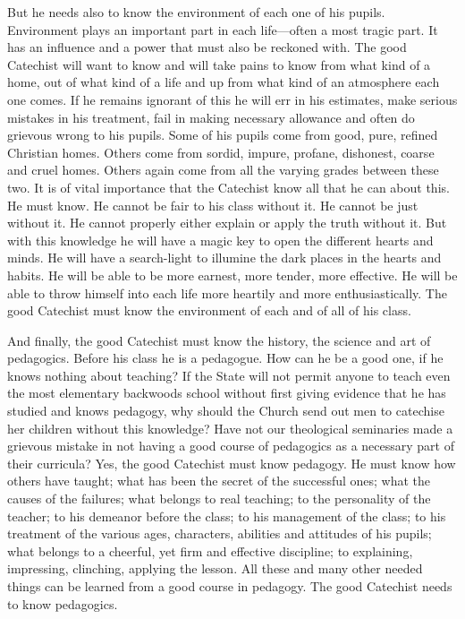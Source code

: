  But he needs also to know the environment of each one of his pupils. Environment plays an important part in each life—often a most tragic part. It has an influence and a power that must also be reckoned with. The good Catechist will want to know and will take pains to know from what kind of a home, out of what kind of a life and up from what kind of an atmosphere each one comes. If he remains ignorant of this he will err in his estimates, make serious mistakes in his treatment, fail in making necessary allowance and often do grievous wrong to his pupils. Some of his pupils come from good, pure, refined Christian homes. Others come from sordid, impure, profane, dishonest, coarse and
cruel homes. Others again come from all the varying grades between these two. It is of vital importance that the Catechist know all that he can about this. He must know. He cannot be fair to his class without it. He cannot be just without it. He cannot properly either explain or apply the truth without it. But with this knowledge he will have a magic key to open the different hearts and minds. He will have a search-light to illumine the dark places in the hearts and habits. He will be able to be more earnest, more tender, more effective. He will be able to throw himself into each life more heartily and more enthusiastically. The good Catechist must know the environment of each and of all of his class.

 And finally, the good Catechist must know the history, the science and art of pedagogics. Before his class he is a pedagogue. How can he be a good one, if he knows nothing about teaching? If the State will not permit anyone to teach even the most elementary backwoods school without first giving evidence that he has studied and knows pedagogy, why should the Church send out men to catechise her children without this knowledge? Have not our theological seminaries made a grievous mistake in not having a good course of pedagogics as a necessary part of their curricula? Yes, the good Catechist must know pedagogy. He must know how others
have taught; what has been the secret of the successful ones; what the causes of the failures; what belongs to real teaching; to the personality of the teacher; to his demeanor before the class; to his management of the class; to his treatment of the various ages, characters, abilities and attitudes of his pupils; what belongs to a cheerful, yet firm and effective discipline; to explaining, impressing, clinching, applying the lesson. All these and many other needed things can be learned from a good course in pedagogy. The good Catechist needs to know pedagogics.

